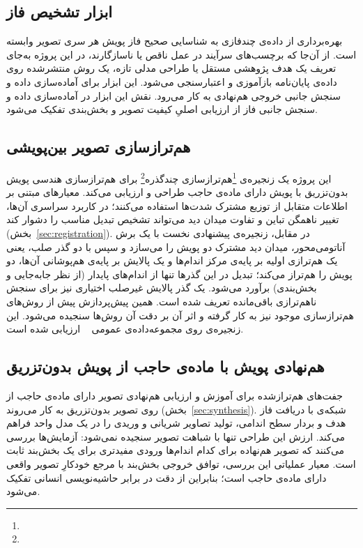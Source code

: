 \subsection{ابزار تشخیص فاز}
\label{subsec:sp-phase}

بهره‌برداری از داده‌ی چندفازی به شناسایی صحیح فاز پویش هر سری تصویر وابسته است. از آن‌جا که برچسب‌های سرآیند  در عمل ناقص یا ناسازگارند، در این پروژه به‌جای تعریف یک هدف پژوهشی مستقل یا طراحی مدلی تازه، یک روش منتشرشده روی داده‌ی پایان‌نامه بازآموزی و اعتبارسنجی می‌شود. این ابزار برای آماده‌سازی داده و سنجش جانبی خروجی هم‌نهادی به کار می‌رود. نقش این ابزار در آماده‌سازی داده و سنجش جانبی فاز از ارزیابی اصلیِ کیفیت تصویر و بخش‌بندی تفکیک می‌شود.

\subsection{هم‌ترازسازی تصویر بین‌پویشی}
\label{subsec:sp-registration}

این پروژه یک زنجیره‌ی \footnote{}هم‌ترازسازی چندگذره\footnote{} برای هم‌ترازسازی هندسی پویش بدون‌تزریق با پویش دارای ماده‌ی حاجب طراحی و ارزیابی می‌کند. معیارهای مبتنی بر اطلاعات متقابل از توزیع مشترک شدت‌ها استفاده می‌کنند؛ در کاربرد سراسری آن‌ها، تغییر ناهمگن تباین و تفاوت میدان دید می‌تواند تشخیص تبدیل مناسب را دشوار کند (بخش~\ref{sec:registration}). در مقابل، زنجیره‌ی پیشنهادی نخست با یک برش آناتومی‌محور، میدان دید مشترک دو پویش را می‌سازد و سپس با دو گذر صلب، یعنی یک هم‌ترازی اولیه بر پایه‌ی مرکز اندام‌ها و یک پالایش بر پایه‌ی هم‌پوشانی آن‌ها، دو پویش را هم‌تراز می‌کند؛ تبدیل در این گذرها تنها از اندام‌های پایدار (از نظر جابه‌جایی و بخش‌بندی) برآورد می‌شود. یک گذر پالایش غیرصلب اختیاری نیز برای سنجش ناهم‌ترازی باقی‌مانده تعریف شده است. همین پیش‌پردازش پیش از روش‌های هم‌ترازسازی موجود نیز به کار گرفته و اثر آن بر دقت آن روش‌ها سنجیده می‌شود. این زنجیره‌ی روی مجموعه‌داده‌ی عمومی ~\cite{zhou2021phaserecog} ارزیابی شده است.

\subsection{هم‌نهادی پویش با ماده‌ی حاجب از پویش بدون‌تزریق}
\label{subsec:sp-synthesis}

جفت‌های هم‌ترازشده برای آموزش و ارزیابی هم‌نهادی تصویر دارای ماده‌ی حاجب از روی تصویر بدون‌تزریق به کار می‌روند (بخش~\ref{sec:synthesis}). شبکه‌ی  با دریافت فاز هدف و بردار سطح اندامی، تولید تصاویر شریانی و وریدی را در یک مدل واحد فراهم می‌کند. ارزش این طراحی تنها با شباهت تصویر سنجیده نمی‌شود: آزمایش‌ها بررسی می‌کنند که تصویر هم‌نهاده برای کدام اندام‌ها ورودی مفیدتری برای یک بخش‌بند ثابت است. معیار عملیاتی این بررسی، توافق خروجی بخش‌بند با مرجع خودکارِ تصویر واقعی دارای ماده‌ی حاجب است؛ بنابراین از دقت در برابر حاشیه‌نویسی انسانی تفکیک می‌شود.

